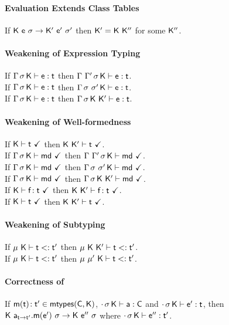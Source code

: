 \documentclass[a4paper,USenglish]{tex/lipics-v2016}
\begin{document}
\paragraph{Evaluation Extends Class Tables}

If ${{\sf{K}}}~{{\sf{e}}}~{\sigma} \rightarrow {{\ensuremath{{\sf{K'}}}}}~{{{{\sf{e'}}}}}~{{{\sigma'}}}$ then ${{\sf{K'}}} = {\sf{K}}~{{\sf{K''}}}$ for some ${{\sf{K''}}}$.

\paragraph{Weakening of Expression Typing}

If $\EnvType\Env\s\K\e\t$ then $\EnvType{\Env~\Envp}\s\K\e\t$. \\ 
If $\EnvType\Env\s\K\e\t$ then $\EnvType\Env{\s~\s'}\K\e\t$. \\ 
If $\EnvType\Env\s\K\e\t$ then $\EnvType\Env\s{\K~\Kp}\e\t$. \\ 

\paragraph{Weakening of Well-formedness}

If $\WFtype\K\t$ then $\WFtype{\K~\Kp}\t$. \\
If $\Gamma\,\sigma\,{\sf{K}}\vdash{\sf{md}} ~\checkmark$ then $\Gamma~\Gamma'\,\sigma\,{\sf{K}}\vdash{\sf{md}} ~\checkmark$.\\
If $\Gamma\,\sigma\,{\sf{K}}\vdash{\sf{md}} ~\checkmark$ then $\Gamma\,\sigma~\sigma'\,{\sf{K}}\vdash{\sf{md}} ~\checkmark$.\\
If $\Gamma\,\sigma\,{\sf{K}}\vdash{\sf{md}} ~\checkmark$ then $\Gamma\,\sigma\,{\sf{K}}~{{\sf{K'}}}\vdash{\sf{md}} ~\checkmark$.\\
If $\WFtype\K{\Fdef\f\t}$ then $\WFtype{\K~\Kp}{\Fdef\f\t}$.\\
If $\WFtype\K\t$ then $\WFtype{\K~\Kp}\t$.\\

\paragraph{Weakening of Subtyping}

If $\StrSub\M{\K}\t\tp$ then $\StrSub\M{\K~\Kp}\t\tp$. \\
If $\StrSub{\M}{\K}\t\tp$ then $\StrSub{\M~\M'}{\K}\t\tp$.

\paragraph{Correctness of \classoff{\C}{\K}}

If $\Mtype\m{\t}\tp \in \classoff{\C}{\K}$, $\cdot\,\sigma\,{\sf{K}}\vdash {\sf{a}} : {\sf{C}}$ and 
$\EnvType\cdot\s\K\ep\t$, then $\Reduce \K{\KCall\a\m{\ep}{\t}{\tp}}\s \K\epp\s$ where $\EnvType\cdot\s\K\epp\tp$.
\end{document}
